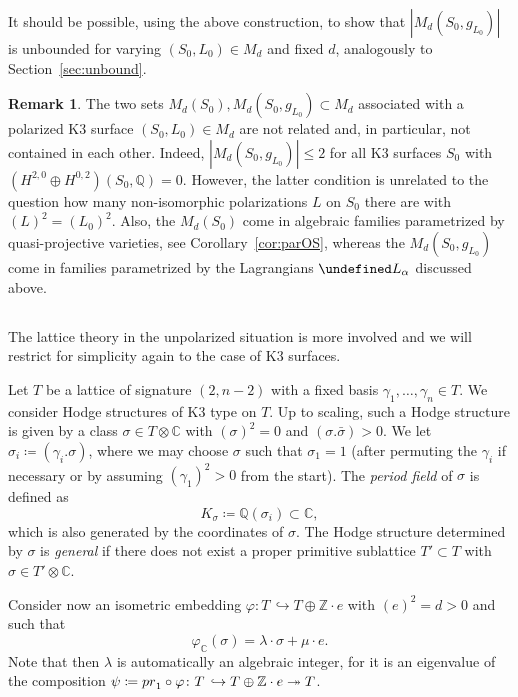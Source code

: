 \documentclass[11pt]{article}
\theoremstyle{definition}
\newtheorem{rema}[theo]{Remark}
\numberwithin{equation}{section}
\numberwithin{figure}{section}
\numberwithin{table}{section}
\let\cal\undefined
\newcommand{\cal}{\mathcal}
\newcommand{\kl}{{\cal L}}
\newcommand{\ZZ}{\mathbb{Z}}
\newcommand{\QQ}{\mathbb{Q}}
\newcommand{\CC}{\mathbb{C}}
\begin{document}
It should be possible, using the above construction, to show that $|M_d(S_0,g_{L_0})|$ is unbounded for varying $(S_0,L_0)\in M_d$ and fixed $d$, analogously to Section~\ref{sec:unbound}.

\begin{rema}
The two sets $M_d(S_0),M_d(S_0,g_{L_0})\subset M_d$ associated with a polarized K3 surface $(S_0,L_0)\in M_d$ are not related and, in particular, not contained in each other. Indeed, $|M_d(S_0,g_{L_0})|\leq2$ for all K3 surfaces $S_0$ with $(H^{2,0}\oplus H^{0,2})(S_0,\QQ)=0$. However, the latter condition is unrelated to the question how many non-isomorphic polarizations $L$ on $S_0$ there are with $(L)^2=(L_0)^2$. Also, the $M_d(S_0)$ come in algebraic families parametrized by quasi-projective varieties, see Corollary~\ref{cor:parOS}, whereas the $M_d(S_0,g_{L_0})$ come in families parametrized by the Lagrangians $\kl_\alpha$ discussed above.
\end{rema}

\subsection{}\label{sec:twistorfini}
The lattice theory in the unpolarized situation is more involved and we will restrict for simplicity again to the case of K3 surfaces.

Let $T$ be a lattice of signature $(2,n-2)$ with a fixed basis $\gamma_1,\dots,\gamma_n\in T$. We consider Hodge structures of K3 type on $T$. Up to scaling, such a Hodge structure is given by a class $\sigma\in T\otimes\CC$ with $(\sigma)^2=0$ and $(\sigma.\bar\sigma)>0$. We let $\sigma_i\coloneqq (\gamma_i.\sigma)$, where we may choose $\sigma$ such that $\sigma_1=1$ (after permuting the $\gamma_i$ if necessary or by assuming $(\gamma_1)^2>0$ from the start).
The \emph{period field} of $\sigma$ is defined as
\[
K_\sigma\coloneqq\QQ(\sigma_i)\subset\CC,
\]
which is also generated by the coordinates of $\sigma$. The Hodge structure determined by $\sigma$ is \emph{general} if there does not exist a proper primitive sublattice $T'\subset T$ with $\sigma\in T'\otimes\CC$.


Consider now an isometric embedding $\varphi\colon T\,\hookrightarrow T\oplus\ZZ\cdot e$ with $(e)^2=d>0$ and such that
\begin{equation}\label{eqn:varphi}
\varphi_\CC(\sigma)=\lambda\cdot \sigma+\mu\cdot e.
\end{equation}
Note that then $\lambda$ is automatically an algebraic integer, for it is an eigenvalue of the composition $\psi\coloneqq{\rm pr}_1\circ\varphi\colon T\,\hookrightarrow T\oplus\ZZ\cdot e\twoheadrightarrow T$.
\end{document}
